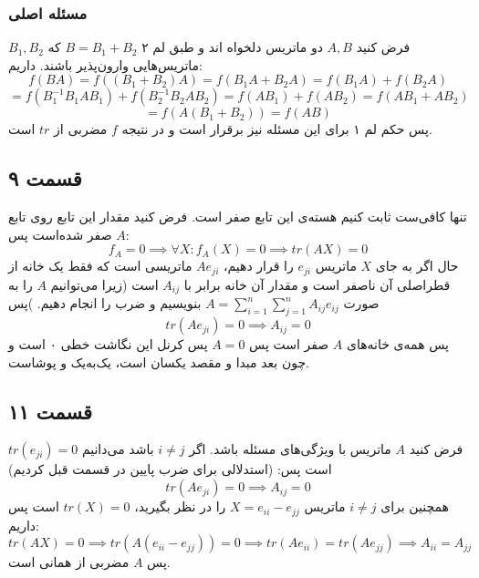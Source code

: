 \documentclass[12pt,a4paper]{article}
\begin{document}
\subsubsection{مسئله اصلی}
فرض کنید $A,B$ دو ماتریس دلخواه اند و طبق لم ۲ 
$B = B_1 + B_2$
که $B_1, B_2$ ماتریس‌هایی وارون‌پذیر باشند.
داریم:
$$f(BA) = f((B_1+B_2)A) = f(B_1A + B_2A) = f(B_1A) + f(B_2 A) $$$$= f(B_1^{-1}B_1AB_1) + f(B_2^{-1}B_2AB_2) = f(AB_1) + f(AB_2) = f(AB_1 + AB_2) $$$$= f(A(B_1+B_2)) = f(AB)$$
پس حکم لم ۱ برای این مسئله نیز برقرار است و در نتیجه $f$ مضربی از $tr$ است.

\subsection{قسمت ۹}
تنها کافی‌ست ثابت کنیم هسته‌ی این تابع صفر است. فرض کنید مقدار این تابع روی تابع $A$ صفر شده‌است پس:
$$
f_A = 0 \implies \forall X: f_A(X) = 0 \implies tr(AX) = 0
$$
حال اگر به جای $X$ ماتریس $e_{ji}$ را قرار دهیم،
$A e_{ji}$
ماتریسی است که فقط یک خانه از قطراصلی آن ناصفر است و مقدار آن خانه برابر با $A_{ij}$ است (زیرا می‌توانیم $A$ را به صورت 
$A = \sum_{i=1}^{n}\sum_{j=1}^{n}A_{ij}e_{ij}$
بنویسیم و ضرب را انجام دهیم.
)پس
$$
tr(Ae_{ji}) = 0 \implies A_{ij} = 0
$$
پس همه‌ی خانه‌های $A$ صفر است پس $A = 0$ پس کرنل این نگاشت خطی ۰ است و چون بعد مبدا و مقصد یکسان است، یک‌به‌یک و پوشاست. 
\subsection{قسمت ۱۱}
فرض کنید $A$ ماتریس با ویژگی‌های مسئله باشد.
اگر $i\neq j$ باشد می‌دانیم $tr(e_{ji}) = 0$ است پس: (استدلالی برای ضرب پایین در قسمت قبل کردیم)
$$tr(A e_{ji}) = 0 \implies A_{ij} = 0$$
همچنین برای $i \neq j$ ماتریس 
$X = e_{ii} - e_{jj}$
را در نظر بگیرید، 
$tr(X) = 0$
است پس داریم:
$$ tr(A X)= 0 \implies tr(A (e_{ii} - e_{jj})) = 0 \implies tr(A e_{ii}) = tr(Ae_{jj}) \implies A_{ii} = A_{jj}$$
پس $A$ مضربی از همانی است.
\end{document}
